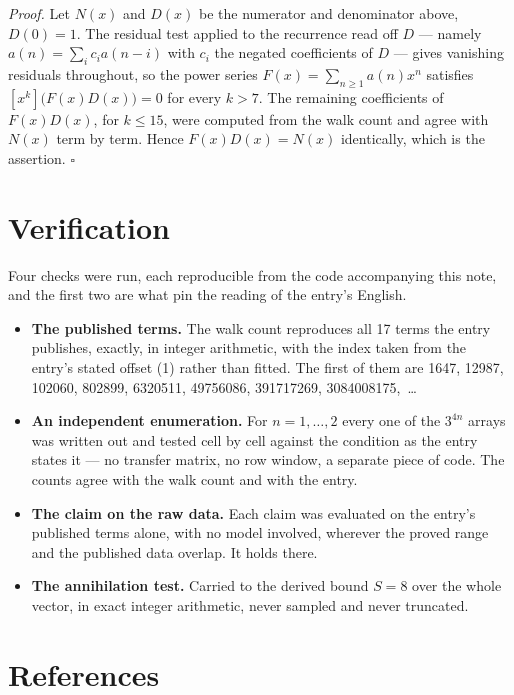 \documentclass[11pt]{article}
\theoremstyle{definition}
\begin{document}
{\itshape Proof.} Let $N(x)$ and $D(x)$ be the numerator and denominator above, $D(0)=1$. The residual test applied to the recurrence read off $D$ --- namely $a(n) = \sum_i c_i a(n-i)$ with $c_i$ the negated coefficients of $D$ --- gives vanishing residuals throughout, so the power series $F(x)=\sum_{n\ge 1}a(n)x^n$ satisfies $[x^k]\bigl(F(x)D(x)\bigr) = 0$ for every $k > 7$. The remaining coefficients of $F(x)D(x)$, for $k \le 15$, were computed from the walk count and agree with $N(x)$ term by term. Hence $F(x)D(x) = N(x)$ identically, which is the assertion. $\square$

\section{Verification}

Four checks were run, each reproducible from the code accompanying this note, and the first two are what pin the reading of the entry's English.

\begin{itemize}

\item {\bfseries The published terms.} The walk count reproduces all 17 terms the entry publishes, exactly, in integer arithmetic, with the index taken from the entry's stated offset (1) rather than fitted. The first of them are 1647, 12987, 102060, 802899, 6320511, 49756086, 391717269, 3084008175,~\dots

\item {\bfseries An independent enumeration.} For $n = 1,\dots,2$ every one of the $3^{4n}$ arrays was written out and tested cell by cell against the condition as the entry states it --- no transfer matrix, no row window, a separate piece of code. The counts agree with the walk count and with the entry.

\item {\bfseries The claim on the raw data.} Each claim was evaluated on the entry's published terms alone, with no model involved, wherever the proved range and the published data overlap. It holds there.

\item {\bfseries The annihilation test.} Carried to the derived bound $S = 8$ over the whole vector, in exact integer arithmetic, never sampled and never truncated.

\end{itemize}

\section{References}
\end{document}
